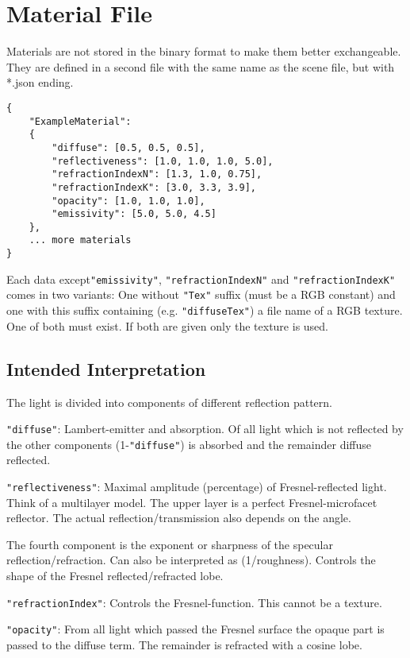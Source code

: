 \documentclass[english,10pt,a4paper,twocolumn,colorscheme=green]{orarticle}
\begin{document}
	\section{Material File}
	\label{sec:materialjson}
	Materials are not stored in the binary format to make them better exchangeable. They are defined in a second file with the same name as the scene file, but with *.json ending.
	\begin{lstlisting}
{
  	"ExampleMaterial": 
  	{
		"diffuse": [0.5, 0.5, 0.5],
		"reflectiveness": [1.0, 1.0, 1.0, 5.0],
		"refractionIndexN": [1.3, 1.0, 0.75],
		"refractionIndexK": [3.0, 3.3, 3.9],
		"opacity": [1.0, 1.0, 1.0],
		"emissivity": [5.0, 5.0, 4.5]
  	},		
	... more materials
}
	\end{lstlisting}
	Each data except\lstinline|"emissivity"|, \lstinline|"refractionIndexN"| and \lstinline|"refractionIndexK"| comes in two variants: One without \lstinline|"Tex"| suffix (must be a RGB constant) and one with this suffix containing (e.g. \lstinline|"diffuseTex"|) a file name of a RGB texture. One of both must exist. If both are given only the texture is used.
	
	\subsection{Intended Interpretation}
	The light is divided into components of different reflection pattern.
	
	\lstinline|"diffuse"|: Lambert-emitter and absorption. Of all light which is not reflected by the other components (1-\lstinline|"diffuse"|) is absorbed and the remainder diffuse reflected.
	
	\lstinline|"reflectiveness"|: Maximal amplitude (percentage) of Fresnel-reflected light. Think of a multilayer model. The upper layer is a perfect Fresnel-microfacet reflector. The actual reflection/transmission also depends on the angle.
	
	The fourth component is the exponent or sharpness of the specular reflection/refraction. Can also be interpreted as (1/roughness). Controls the shape of the Fresnel reflected/refracted lobe.
	
	\lstinline|"refractionIndex"|: Controls the Fresnel-function. This cannot be a texture.
	
	\lstinline|"opacity"|: From all light which passed the Fresnel surface the opaque part is passed to the diffuse term. The remainder is refracted with a cosine lobe. %
	
\end{document}
